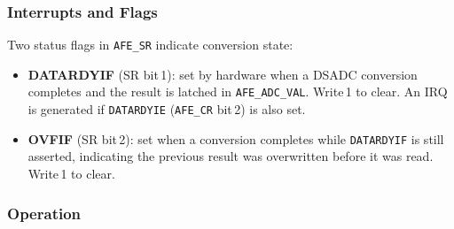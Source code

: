 \subsubsection*{Interrupts and Flags}

Two status flags in \texttt{AFE\_SR} indicate conversion state:

\begin{itemize}
    \item \textbf{DATARDYIF} (SR bit\,1): set by hardware when a DSADC conversion completes and the result is latched in \texttt{AFE\_ADC\_VAL}. Write\,1 to clear. An IRQ is generated if \texttt{DATARDYIE} (\texttt{AFE\_CR} bit\,2) is also set.
    \item \textbf{OVFIF} (SR bit\,2): set when a conversion completes while \texttt{DATARDYIF} is still asserted, indicating the previous result was overwritten before it was read. Write\,1 to clear.
\end{itemize}

\subsubsection*{Operation}



